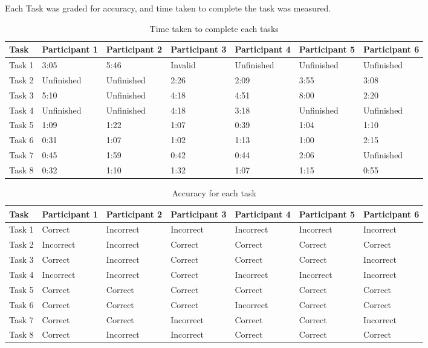 Each Task was graded for accuracy, and time taken to complete the task was measured.
\begin{table}[tbh]
\centering
\begin{tabular}{l|*{6}{l|}}
Task & Participant 1 & Participant  2 & Participant  3 & Participant  4 & Participant 5 & Participant 6 \\
\hline
Task 1 & 3:05 & 5:46 & Invalid & Unfinished & Unfinished & Unfinished \\
Task 2 & Unfinished & Unfinished & 2:26 & 2:09 & 3:55 & 3:08 \\
Task 3 & 5:10 & Unfinished & 4:18 & 4:51 & 8:00 & 2:20 \\
Task 4 & Unfinished & Unfinished & 4:18 & 3:18 & Unfinished & Unfinished \\
Task 5 & 1:09 & 1:22 & 1:07 & 0:39 & 1:04 & 1:10 \\
Task 6 & 0:31 & 1:07 & 1:02 & 1:13 & 1:00 & 2:15 \\
Task 7 & 0:45 & 1:59 & 0:42 & 0:44 & 2:06 & Unfinished \\
Task 8 & 0:32 & 1:10 & 1:32 & 1:07 & 1:15 & 0:55 \\
\end{tabular}
\caption{Time taken to complete each tasks}
\label{res_times}
\end{table}

\begin{table}[tbh]
\centering
\begin{tabular}{l|*{6}{l|}}
Task & Participant 1 & Participant  2 & Participant  3 & Participant  4 & Participant 5 & Participant 6 \\
\hline
Task 1 & Correct & Incorrect & Incorrect & Incorrect & Incorrect & Incorrect\\
Task 2 & Incorrect & Incorrect & Correct & Correct & Correct & Correct\\
Task 3 & Correct & Incorrect & Correct & Correct & Correct & Incorrect\\
Task 4 & Incorrect & Incorrect & Correct & Incorrect & Incorrect & Incorrect\\
Task 5 & Correct & Correct & Correct & Correct & Correct & Correct\\
Task 6 & Correct & Correct & Correct & Incorrect & Correct & Correct\\
Task 7 & Correct & Correct & Incorrect & Correct & Correct & Incorrect\\
Task 8 & Correct & Incorrect & Incorrect & Correct & Correct & Correct\\
\end{tabular}
\caption{Accuracy for each task}
\label{res_acc}
\end{table}

